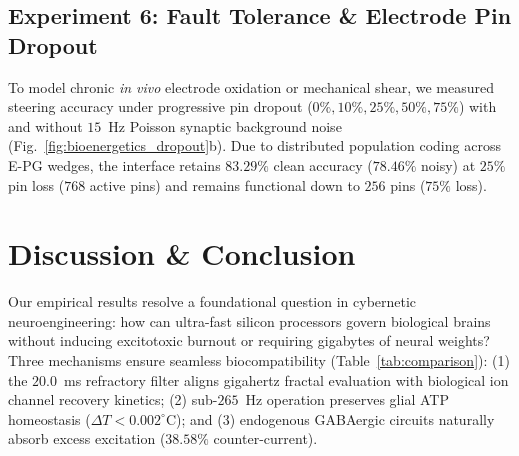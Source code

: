 \documentclass[10pt,twocolumn]{article}
\begin{document}
\subsection{Experiment 6: Fault Tolerance \& Electrode Pin Dropout}
To model chronic \textit{in vivo} electrode oxidation or mechanical shear, we measured steering accuracy under progressive pin dropout ($0\%, 10\%, 25\%, 50\%, 75\%$) with and without $15$~Hz Poisson synaptic background noise (Fig.~\ref{fig:bioenergetics_dropout}b). Due to distributed population coding across E-PG wedges, the interface retains $83.29\%$ clean accuracy ($78.46\%$ noisy) at $25\%$ pin loss ($768$ active pins) and remains functional down to $256$ pins ($75\%$ loss).

\begin{table}[t]
\centering
\caption{\textbf{Comparison with Neuromorphic \& BMI Architectures.}}
\label{tab:comparison}
\vspace{0.1cm}
\end{table}

\section{Discussion \& Conclusion}
Our empirical results resolve a foundational question in cybernetic neuroengineering: how can ultra-fast silicon processors govern biological brains without inducing excitotoxic burnout or requiring gigabytes of neural weights? Three mechanisms ensure seamless biocompatibility (Table~\ref{tab:comparison}): (1) the $20.0$~ms refractory filter aligns gigahertz fractal evaluation with biological ion channel recovery kinetics; (2) sub-$265$~Hz operation preserves glial ATP homeostasis ($\Delta T < 0.002^\circ\text{C}$); and (3) endogenous GABAergic circuits naturally absorb excess excitation ($38.58\%$ counter-current).
\end{document}
